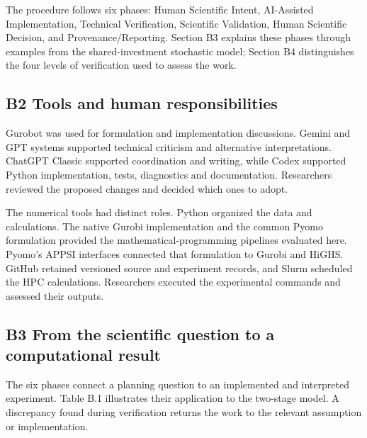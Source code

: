 \documentclass[
  english,
  11pt,
  a4paper,
]{article}
\begin{document}
The procedure follows six phases: Human Scientific Intent, AI-Assisted
Implementation, Technical Verification, Scientific Validation, Human
Scientific Decision, and Provenance/Reporting. Section B3 explains these
phases through examples from the shared-investment stochastic model;
Section B4 distinguishes the four levels of verification used to assess
the work.

\subsection{B2 Tools and human
responsibilities}\label{b2-tools-and-human-responsibilities}

Gurobot was used for formulation and implementation discussions. Gemini
and GPT systems supported technical criticism and alternative
interpretations. ChatGPT Classic supported coordination and writing,
while Codex supported Python implementation, tests, diagnostics and
documentation. Researchers reviewed the proposed changes and decided
which ones to adopt.

The numerical tools had distinct roles. Python organized the data and
calculations. The native Gurobi implementation and the common Pyomo
formulation provided the mathematical-programming pipelines evaluated
here. Pyomo's APPSI interfaces connected that formulation to Gurobi and
HiGHS. GitHub retained versioned source and experiment records, and
Slurm scheduled the HPC calculations. Researchers executed the
experimental commands and assessed their outputs.

\subsection{B3 From the scientific question to a computational
result}\label{b3-from-the-scientific-question-to-a-computational-result}

The six phases connect a planning question to an implemented and
interpreted experiment. Table B.1 illustrates their application to the
two-stage model. A discrepancy found during verification returns the
work to the relevant assumption or implementation.
\end{document}

